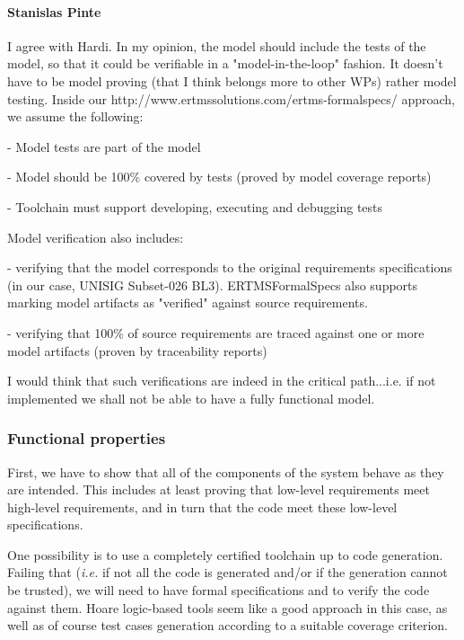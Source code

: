 \documentclass[11pt, a4paper]{article}
\begin{document}
\paragraph{Stanislas Pinte}
I agree with Hardi.
In my opinion, the model should include the tests of the model, so that it could be verifiable in a "model-in-the-loop" fashion.
It doesn't have to be model proving (that I think belongs more to other WPs) rather model testing.
Inside our http://www.ertmssolutions.com/ertms-formalspecs/ approach, we assume the following:

- Model tests are part of the model

- Model should be 100\% covered by tests (proved by model coverage reports)

- Toolchain must support developing, executing and debugging tests

Model verification also includes:

- verifying that the model corresponds to the original requirements specifications (in our case, UNISIG Subset-026 BL3). ERTMSFormalSpecs also supports marking model artifacts as "verified" against source requirements.

- verifying that 100\% of source requirements are traced against one or more model artifacts (proven by traceability reports)

I would think that such verifications are indeed in the critical path...i.e. if not implemented we shall not be able to have a fully functional model.



\subsubsection{Functional properties}

First, we have to show that all of the components of the system behave as they
are intended. This includes at least proving that low-level requirements meet
high-level requirements, and in turn that the code meet these low-level
specifications.

One possibility is to use a completely certified toolchain up
to code generation. Failing that ({\it i.e.} if not all the code is generated
and/or if the generation cannot be trusted), we will need to have formal
specifications and to verify the code against them. Hoare logic-based tools
seem like a good approach in this case, as well as of course test cases
generation according to a suitable coverage criterion.
\end{document}

